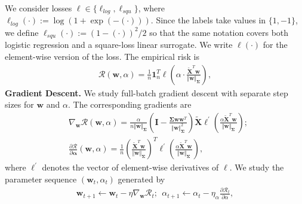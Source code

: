\documentclass[pdflatex,sn-basic]{sn-jnl}%
\theoremstyle{thmstyleone}%
\begin{document}
We consider losses $\ell \in \{\ell_{log}, \ell_{squ}\}$, where
$\ell_{log} \left(\cdot\right) := \log\left(1 + \exp \left(-(\cdot)\right)\right)$.
Since the labels take values in $\{1, -1\}$, we define
$\ell_{squ} \left(\cdot\right) := {(1 - (\cdot))^2}/{2}$
so that the same notation covers both logistic regression and a square-loss linear surrogate. We write $\boldsymbol{\ell}\left(\cdot\right)$ for the element-wise version of the loss. The empirical risk is
\begin{equation*}
\begin{aligned}
  \mathcal{R} \left( \mathbf{w}, \alpha \right)
  =
  \frac{1}{n} \mathbf{1}_{n}^T \boldsymbol{\ell} \left( \alpha \cdot
    \frac{\tilde{\mathbf{X}}^T \mathbf{w}}{\Vert \mathbf{w} \Vert_{\mathbf{\Sigma}}} 
  \right),
\end{aligned}
\end{equation*}
\noindent\textbf{Gradient Descent.}
We study full-batch gradient descent with separate step sizes for $\mathbf{w}$ and $\alpha$. The corresponding gradients are
\begin{equation*}
\begin{aligned}
  & \nabla_{\mathbf{w}} \mathcal{R} \left(\mathbf{w}, \alpha\right) 
  = 
  \frac{\alpha}{n \Vert \mathbf{w} \Vert_{\mathbf{\Sigma}}}
  \left(
    \mathbf{I} - \frac{\mathbf{\Sigma} \mathbf{w} \mathbf{w}^{T}}{\Vert \mathbf{w} \Vert_{\mathbf{\Sigma}}^{2}}
  \right)
  \tilde{\mathbf{X}} 
  \boldsymbol{\ell^\prime}\left(
    \frac{
    \alpha \tilde{\mathbf{X}}^T \mathbf{w}
    }{\Vert \mathbf{w} \Vert_\mathbf{\Sigma}}
  \right);
  \\ & 
  \frac{\partial \mathcal{R}}{\partial \mathbf{\alpha}} \left(\mathbf{w}, \alpha\right)
  = 
  \frac{1}{n}
  \left(
    \frac{
      \tilde{\mathbf{X}}^{T} \mathbf{w}
      }{ \Vert \mathbf{w} \Vert_\mathbf{\Sigma}}
  \right)^T 
  \boldsymbol{\ell^\prime}\left(
    \frac{
    \alpha \tilde{\mathbf{X}}^T \mathbf{w}
    }{\Vert \mathbf{w} \Vert_\mathbf{\Sigma}}
  \right),
\end{aligned}
\end{equation*}
where $\boldsymbol{\ell^{\prime}}$ denotes the vector of element-wise derivatives of $\ell$.
We study the parameter sequence $(\mathbf{w}_t, \alpha_t)$ generated by
\begin{equation}\label{gradient_updata}
\begin{aligned}
  \mathbf{w}_{t+1} \leftarrow \mathbf{w}_{t} - \eta 
  \nabla_{\mathbf{w}} \mathcal{R}_t; \ \ 
  \alpha_{t+1} \leftarrow \alpha_{t} - \eta_{\alpha} 
  \frac{\partial \mathcal{R}_t}{\partial \alpha},
\end{aligned}
\end{equation}
\end{document}
